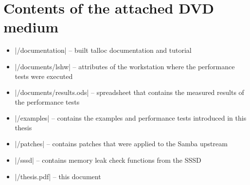 \chapter{Contents of the attached DVD medium}

\begin{itemize}
  \item |/documentation| -- built talloc documentation and tutorial
  \item |/documents/lshw| -- attributes of the workstation where the performance
  tests were executed
  \item |/documents/results.ods| -- spreadsheet that contains the measured
  results of the performance tests
  \item |/examples| -- contains the examples and performance tests introduced
  in this thesis
  \item |/patches| -- contains patches that were applied to the Samba upstream
  \item |/sssd| -- contains memory leak check functions from the SSSD
  \item |/thesis.pdf| -- this document
\end{itemize}
